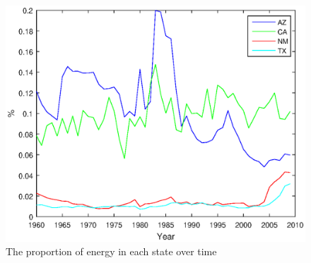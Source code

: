 \documentclass{mcmthesis}
\begin{document}
\begin{figure}[htbp]
{\begin{minipage}{7cm}
			\includegraphics[scale=0.4]{figure/Thedistributionofrenewableenergyovertime}    %
	\end{minipage}}
	\caption{The  proportion of energy in each state over time}                      %
	\label{fig:fenbutu}                                       %
\end{figure}
\end{document}
